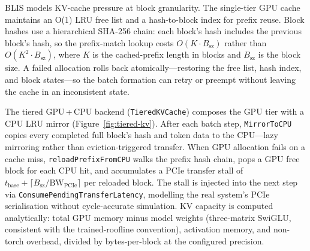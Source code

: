 \documentclass[11pt]{article}
\theoremstyle{plain} %
\theoremstyle{definition} %
\theoremstyle{remark} %
\newcommand{\code}[1]{\texttt{#1}}
\numberwithin{equation}{section}
\begin{document}
BLIS models KV-cache pressure at block granularity.
The single-tier GPU cache maintains an O(1) LRU free list and a hash-to-block
index for prefix reuse.
Block hashes use a hierarchical SHA-256 chain: each block's hash includes the
previous block's hash, so the prefix-match lookup costs $O(K \cdot B_\text{sz})$
rather than $O(K^2 \cdot B_\text{sz})$, where $K$ is the cached-prefix length
in blocks and $B_\text{sz}$ is the block size.
A failed allocation rolls back atomically---restoring the free list, hash index,
and block states---so the batch formation can retry or preempt without leaving
the cache in an inconsistent state.

The tiered GPU\,+\,CPU backend (\code{TieredKVCache}) composes the GPU tier with
a CPU LRU mirror (Figure~\ref{fig:tiered-kv}).
After each batch step, \code{MirrorToCPU} copies every completed full block's
hash and token data to the CPU---lazy mirroring rather than eviction-triggered
transfer.
When GPU allocation fails on a cache miss, \code{reloadPrefixFromCPU} walks the
prefix hash chain, pops a GPU free block for each CPU hit, and accumulates a PCIe
transfer stall of $t_\text{base} + \lceil B_\text{sz} / \text{BW}_\text{PCIe} \rceil$
per reloaded block.
The stall is injected into the next step via \code{ConsumePendingTransferLatency},
modelling the real system's PCIe serialisation without cycle-accurate simulation.
KV capacity is computed analytically: total GPU memory minus model weights
(three-matrix SwiGLU, consistent with the trained-roofline convention),
activation memory, and non-torch overhead, divided by bytes-per-block at the
configured precision.
\end{document}
